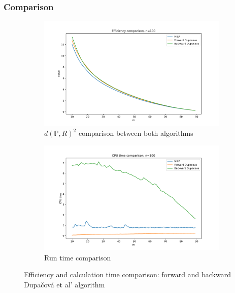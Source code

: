 \documentclass{amsart}
\begin{document}
\subsubsection{Comparison}

\begin{figure}[ht]
    \centering
    \begin{subfigure}[b]{0.45\textwidth}
        \centering
        \includegraphics[width=\textwidth]{plots/efficiency milp.pdf}
        \caption{$d\left(\mathbb{P},R\right)^2$ comparison between both algorithms}
        \label{dist for bac}
    \end{subfigure}
    \hfill
    \begin{subfigure}[b]{0.45\textwidth}
        \centering
        \includegraphics[width=\textwidth]{plots/run time milp.pdf}
        \caption{Run time comparison}
        \label{time for bac}
    \end{subfigure}
    \caption{Efficiency and calculation time comparison: forward and backward Dupačová et al' algorithm}
    \label{comparison dup}
\end{figure}
\end{document}

